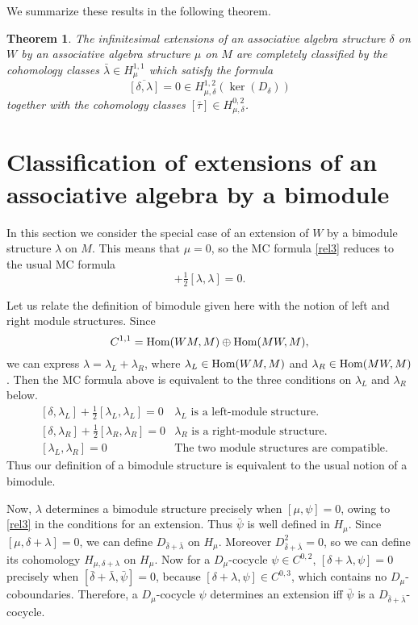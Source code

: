 \documentclass[12pt]{amsart}
\newtheorem{thm}{Theorem}[section]
\theoremstyle{definition}
\begin{document}
We summarize these results in the following theorem.
\begin{thm}\label{th3}
The infinitesimal extensions of an associative algebra structure $\delta$ on $W$ by an associative algebra structure
$\mu$ on $M$ are completely classified by the cohomology classes $\bar\lambda\in H^{1,1}_\mu$
 which satisfy the formula
$$\overline{[\delta,\lambda]}=0\in H^{1,2}_{\mu,\delta}(\ker(D_\delta))$$
together with the cohomology classes $[\bar\tau]\in H_{\mu,\delta}^{0,2}$.
\end{thm}
\section{Classification of extensions of an associative algebra by a
bimodule}\label{sec5}
 In this section we consider the special case
of an extension of $W$ by a bimodule structure $\lambda$ on $M$.
This means that $\mu=0$, so the MC formula \eqref{rel3} reduces to
the usual MC formula
\begin{equation*}
[\delta,\lambda]+\tfrac12[\lambda,\lambda]=0.
\end{equation*}

Let us relate the definition of bimodule given here with the notion of left and right module structures.
Since
\begin{equation*}
C^{1,1}={\mbox{\rm Hom}}(WM,M)\oplus{\mbox{\rm Hom}}(MW,M),
\end{equation*}
we can express $\lambda=\lambda_L+\lambda_R$,
where
$\lambda_L\in{\mbox{\rm Hom}}(WM,M)$ and $\lambda_R\in{\mbox{\rm Hom}}(MW,M)$. Then the MC formula above is equivalent to the
three conditions on $\lambda_L$ and $\lambda_R$ below.
\begin{align*}
&[\delta,\lambda_L]+\tfrac12[\lambda_L,\lambda_L]=0& \text{$\lambda_L$ is a left-module structure.}\\
&[\delta,\lambda_R]+\tfrac12[\lambda_R,\lambda_R]=0& \text{$\lambda_R$ is a right-module structure.}\\
&[\lambda_L,\lambda_R]=0& \text{The two module structures are compatible.}
\end{align*}
Thus our definition of a bimodule structure is equivalent to the usual notion of a bimodule.

Now, $\lambda$ determines a bimodule  structure precisely when $[\mu,\psi]=0$, owing to
\eqref{rel3} in the conditions for an extension.  Thus $\bar\psi$ is well defined in $H_\mu$.
Since $[\mu,\delta+\lambda]=0$, we can define $D_{\bar\delta+\bar\lambda}$ on ${H_\mu}$. Moreover $D^2_{\bar\delta+\bar\lambda}=0$,
so we can define its cohomology $H_{\mu,\delta+\lambda}$ on ${H_\mu}$. Now
for a $D_\mu$-cocycle $\psi\in C^{0,2}$, $[\delta+\lambda,\psi]=0$ precisely when
$[{\bar\delta+\bar\lambda},\bar\psi]=0$, because $[\delta+\lambda,\psi]\in C^{0,3}$, which contains no $D_\mu$-coboundaries.
Therefore, a $D_\mu$-cocycle $\psi$ determines an extension iff $\bar\psi$ is a $D_{\bar\delta+\bar\lambda}$-cocycle.
\end{document}
